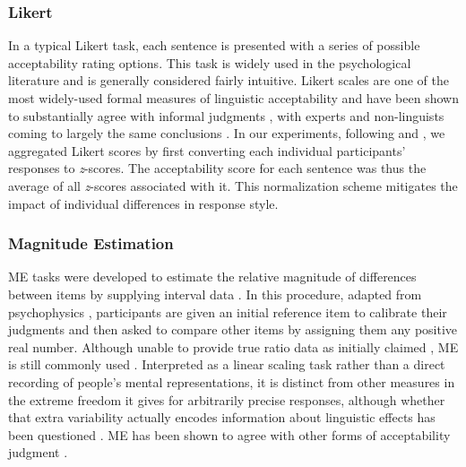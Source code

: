 \documentclass[doc]{apa6}
\newcommand{\ME}{{\sc ME}}%
\newcommand{\likert}{{\sc Likert}}
\begin{document}
\subsubsection{Likert}
In a typical \likert{} task, each sentence is presented with a series of possible acceptability rating options. This task is widely used in the psychological literature \citep{likert1932measureattitudes,hartley2014thoughtsaboutlikert}
 and is generally considered fairly intuitive.
 \likert{} scales are one of the most widely-used formal measures of linguistic acceptability \citep{schutze2014judgmentdata} and have been shown to substantially agree with informal judgments \citep{sprouse2013formalinformal}, with experts and non-linguists coming to largely the same conclusions \citep{culbertson2009linguistsbettersubjects}.
In our experiments, following \citet{sprouse2013formalinformal} and \citet{mahowald2016snap},
we aggregated \likert{} scores by first converting each individual participants' responses to {\it z}-scores. The acceptability score for each sentence was thus the average of all {\it z}-scores associated with it. This normalization scheme mitigates the impact of individual differences in response style.




\subsubsection{Magnitude Estimation}
\ME{} tasks were developed to estimate the relative magnitude of differences between items by supplying interval data \citep{bard1996magnitudeestimation}. In this procedure, adapted from psychophysics \citep{stevens1956sensorymagnitude}, participants are given an initial reference item to calibrate their judgments and then asked to compare other items by assigning them any positive real number.
Although unable to provide true ratio data as initially claimed \citep{weskott2008varinfodiffmeasures,sprouse2008nonlinear,sprouse2011commutativity}, \ME{} is still commonly used \citep{keller2003psychophysicallinguistic,johnson2011quantmethods,featherston2005MEwhatitcando,schutze2011linguisticevidence,cowart1997experimentalsyntax,murphy2006representativeuseofME,erlewine2016streamlinedturklingexp}. Interpreted as a linear scaling task rather than a direct recording of people's mental representations, it is distinct from other measures in the extreme freedom it gives for arbitrarily precise responses, although whether that extra variability actually encodes information about linguistic effects has been questioned \citep{weskott2011informativity}. \ME{} has been shown to agree with other forms of acceptability judgment \citep{keller2001MEreplicatesordscale,weskott2009scaling}.
\end{document}
